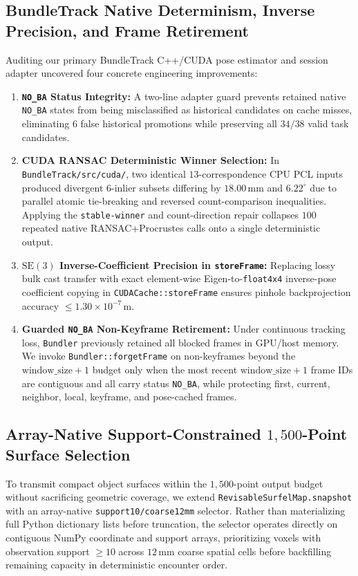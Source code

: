 \documentclass[10pt,journal]{IEEEtran}
\begin{document}
\subsection{BundleTrack Native Determinism, Inverse Precision, and Frame Retirement}
\label{sec:native_bt}
Auditing our primary BundleTrack C++/CUDA pose estimator and session adapter uncovered four concrete engineering improvements:
\begin{enumerate}
    \item \textbf{\texttt{NO\_BA} Status Integrity:} A two-line adapter guard prevents retained native \texttt{NO\_BA} states from being misclassified as historical candidates on cache misses, eliminating $6$ false historical promotions while preserving all $34/38$ valid task candidates.
    \item \textbf{CUDA RANSAC Deterministic Winner Selection:} In \texttt{BundleTrack/src/cuda/}, two identical $13$-correspondence CPU PCL inputs produced divergent $6$-inlier subsets differing by $18.00\,\mathrm{mm}$ and $6.22^\circ$ due to parallel atomic tie-breaking and reversed count-comparison inequalities. Applying the \texttt{stable-winner} and count-direction repair collapses $100$ repeated native RANSAC+Procrustes calls onto a single deterministic output.
    \item \textbf{$\mathrm{SE}(3)$ Inverse-Coefficient Precision in \texttt{storeFrame}:} Replacing lossy bulk cast transfer with exact element-wise Eigen-to-\texttt{float4x4} inverse-pose coefficient copying in \texttt{CUDACache::storeFrame} ensures pinhole backprojection accuracy $\le 1.30\times 10^{-7}\,\mathrm{m}$.
    \item \textbf{Guarded \texttt{NO\_BA} Non-Keyframe Retirement:} Under continuous tracking loss, \texttt{Bundler} previously retained all blocked frames in GPU/host memory. We invoke \texttt{Bundler::forgetFrame} on non-keyframes beyond the $\text{window\_size}+1$ budget only when the most recent $\text{window\_size}+1$ frame IDs are contiguous and all carry status \texttt{NO\_BA}, while protecting first, current, neighbor, local, keyframe, and pose-cached frames.
\end{enumerate}

\subsection{Array-Native Support-Constrained $1{,}500$-Point Surface Selection}
\label{sec:surface_selection}
To transmit compact object surfaces within the $1{,}500$-point output budget without sacrificing geometric coverage, we extend \texttt{RevisableSurfelMap.snapshot} with an array-native \texttt{support10/coarse12mm} selector. Rather than materializing full Python dictionary lists before truncation, the selector operates directly on contiguous NumPy coordinate and support arrays, prioritizing voxels with observation support $\ge 10$ across $12\,\mathrm{mm}$ coarse spatial cells before backfilling remaining capacity in deterministic encounter order.
\end{document}
